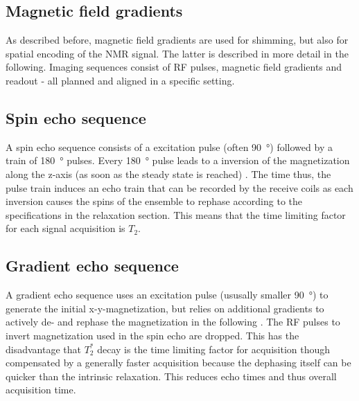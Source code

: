         \subsection{Magnetic field gradients}
        As described before, magnetic field gradients are used for shimming, but also for spatial encoding of the NMR signal. The latter is described in more detail in the following. Imaging sequences consist of RF pulses, magnetic field gradients and readout - all planned and aligned in a specific setting.
        \subsection{Spin echo sequence}
            A spin echo sequence consists of a excitation pulse (often \SI{90}{\degree}) followed by a train of \SI{180}{\degree} pulses. Every 180\SI{}{\degree} pulse leads to a inversion of the magnetization along the z-axis (as soon as the steady state is reached) \cite{brown_mri_2005}. The time thus, the pulse train induces an echo train that can be recorded by the receive coils as each inversion causes the spins of the ensemble to rephase according to the specifications in the relaxation section. This means that the time limiting factor for each signal acquisition is $T_2$. 
        \subsection{Gradient echo sequence}
            A gradient echo sequence uses an excitation pulse (ususally smaller \SI{90}{\degree}) to generate the initial x-y-magnetization, but relies on additional gradients to actively de- and rephase the magnetization in the following \cite{brown_mri_2005}. The RF pulses to invert magnetization used in the spin echo are dropped. This has the disadvantage that $T_2^*$ decay is the time limiting factor for acquisition though compensated by a generally faster acquisition because the dephasing itself can be quicker than the intrinsic relaxation. This reduces echo times and thus overall acquisition time.
